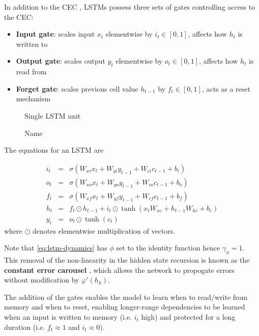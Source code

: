 In addition to the CEC , LSTMs possess three sets of gates controlling
access to the CEC:
\begin{itemize}
    \item \textbf{Input gate}: scales input $x_t$ elementwise by $i_t \in [0,1]$, affects how $h_t$ is written to
    \item \textbf{Output gate}: scales output $y_t$ elementwise by $o_t \in [0,1]$, affects how $h_t$ is read from
    \item \textbf{Forget gate}: scales previous cell value $h_{t-1}$ by $f_t \in [0,1]$, acts as a reset mechanism
\end{itemize}

\begin{figure}[htpb]
    \centering
    
    \caption{Single LSTM unit}
    \label{fig:lstm-unit}
\end{figure}

\begin{figure}[htpb]
    \centering
    
    \caption{Name}
    \label{fig:name}
\end{figure}

The equations for an LSTM are

\begin{eqnarray}
    i_t &=& \sigma(W_{xi} x_t + W_{yi} y_{t-1} + W_{ci} c_{t-1} + b_i) \\
    o_t &=& \sigma(W_{xo} x_t + W_{yo} y_{t-1} + W_{co} c_{t-1} + b_o) \\
    f_t &=& \sigma(W_{xf} x_t + W_{yf} y_{t-1} + W_{cf} c_{t-1} + b_f) \\
    h_t &=& f_t \odot h_{t-1} + i_t \odot \tanh(x_t W_{xc} + h_{t-1} W_{hc} + b_c) \label{eq:lstm-dynamics} \\
    y_t &=& o_t \odot \tanh(c_t)
\end{eqnarray}
where $\odot$ denotes elementwise multiplication of vectors.

Note that \autoref{eq:lstm-dynamics} has $\phi$ set to the identity function
hence $\gamma_\phi = 1$. This removal of the non-linearity in the hidden state
recursion is known as the \textbf{constant error carousel} , which
allows the network to propogate errors without modification by $\varphi'(h_k)$.

The addition of the gates enables the model to learn when to read/write from
memory and when to reset, enabling longer-range dependencies to be learned when
an input is written to memory (i.e. $i_t$ high) and protected for a long
duration (i.e. $f_t \approx 1$ and $i_t \approx 0$).

